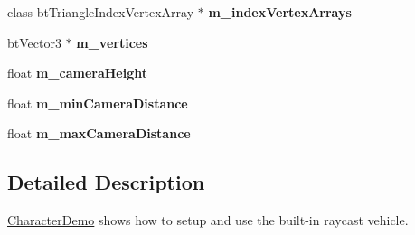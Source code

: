 \begin{DoxyCompactItemize}
\item 
\hypertarget{class_character_demo_a558e40d5680e5b353ae44120be875327}{class bt\+Triangle\+Index\+Vertex\+Array $\ast$ {\bfseries m\+\_\+index\+Vertex\+Arrays}}\label{class_character_demo_a558e40d5680e5b353ae44120be875327}

\item 
\hypertarget{class_character_demo_acef5d86d7365167384ea05d5af6ef6a4}{bt\+Vector3 $\ast$ {\bfseries m\+\_\+vertices}}\label{class_character_demo_acef5d86d7365167384ea05d5af6ef6a4}

\item 
\hypertarget{class_character_demo_a5320c9ab745dbe4424682c70e560b0c2}{float {\bfseries m\+\_\+camera\+Height}}\label{class_character_demo_a5320c9ab745dbe4424682c70e560b0c2}

\item 
\hypertarget{class_character_demo_ab040ee5578ae6102281d1a4beec4ce21}{float {\bfseries m\+\_\+min\+Camera\+Distance}}\label{class_character_demo_ab040ee5578ae6102281d1a4beec4ce21}

\item 
\hypertarget{class_character_demo_ac15901fc286f1ce210e82a9619b8cdf3}{float {\bfseries m\+\_\+max\+Camera\+Distance}}\label{class_character_demo_ac15901fc286f1ce210e82a9619b8cdf3}

\end{DoxyCompactItemize}


\subsection{Detailed Description}
\hyperlink{class_character_demo}{Character\+Demo} shows how to setup and use the built-\/in raycast vehicle. 

